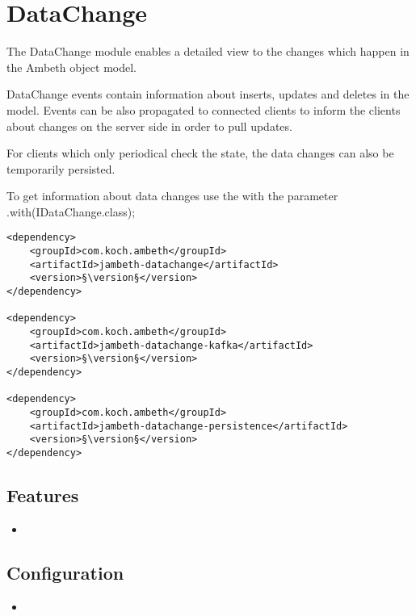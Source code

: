\section{DataChange}
\label{module:DataChange}
\ClearAPI
\TODO
The DataChange module enables a detailed view to the changes which happen in the Ambeth object model. 

DataChange events contain information about inserts, updates and deletes in the model. Events can be also propagated to connected clients to inform the clients about changes on the server side in order to pull updates.

For clients which only periodical check the state, the data changes can also be temporarily persisted.

To get information about data changes use the  with the parameter .with(IDataChange.class);

\begin{lstlisting}[style=POM,caption={Maven modules to use \emph{Ambeth DataChange}}]
<dependency>
	<groupId>com.koch.ambeth</groupId>
	<artifactId>jambeth-datachange</artifactId>
	<version>§\version§</version>
</dependency>

<dependency>
	<groupId>com.koch.ambeth</groupId>
	<artifactId>jambeth-datachange-kafka</artifactId>
	<version>§\version§</version>
</dependency>

<dependency>
	<groupId>com.koch.ambeth</groupId>
	<artifactId>jambeth-datachange-persistence</artifactId>
	<version>§\version§</version>
</dependency>
\end{lstlisting}
\subsection{Features}
\begin{itemize}
	\item {}
\end{itemize}

\subsection{Configuration}
\begin{itemize}
	\item {}
\end{itemize}
